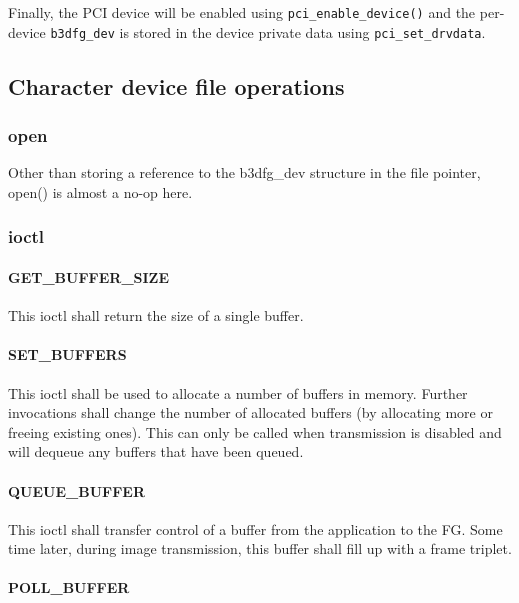 \documentclass[12pt]{article}
\begin{document}
Finally, the PCI device will be enabled using \texttt{pci\_enable\_device()} and the per-device \texttt{b3dfg\_dev} is stored in the device private data using \texttt{pci\_set\_drvdata}.

\subsection{Character device file operations}

\subsubsection{open}

Other than storing a reference to the b3dfg\_dev structure in the file pointer, open() is almost a no-op here.

\subsubsection{ioctl}

\paragraph{GET\_BUFFER\_SIZE}

This ioctl shall return the size of a single buffer.

\paragraph{SET\_BUFFERS}

This ioctl shall be used to allocate a number of buffers in memory. Further invocations shall change the number of allocated buffers (by allocating more or freeing existing ones). This can only be called when transmission is disabled and will dequeue any buffers that have been queued.

\paragraph{QUEUE\_BUFFER}

This ioctl shall transfer control of a buffer from the application to the FG. Some time later, during image transmission, this buffer shall fill up with a frame triplet.

\paragraph{POLL\_BUFFER}
\end{document}

